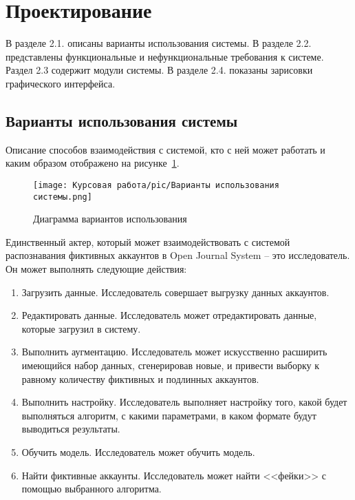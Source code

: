 \newpage
\section{Проектирование}
\label{sec:designing}
В разделе 2.1. описаны варианты использования системы. В разделе 2.2. представлены функциональные и нефункциональные требования к системе. Раздел 2.3 содержит модули системы. В разделе 2.4. показаны зарисовки графического интерфейса.

\vspace{1.5em}
\subsection{Варианты использования системы}
\label{subsec:Variants}
Описание способов взаимодействия с системой, кто с ней может работать и каким образом отображено на рисунке~\ref{ris:variantsUse}.

\begin{figure}[ht]
    \texttt{[image: Курсовая работа/pic/Варианты использования системы.png]}
    \caption{Диаграмма вариантов использования}
    \label{ris:variantsUse}
\end{figure}

Единственный актер, который может взаимодействовать с системой распознавания фиктивных аккаунтов в Open Journal System -- это исследователь. Он может выполнять следующие действия:
\vspace{-1.5em}
\begin{enumerate}[itemsep=0pt, topsep=1.5em]
    \item Загрузить данные. Исследователь совершает выгрузку данных аккаунтов.
    \item Редактировать данные. Исследователь может отредактировать данные, которые загрузил в систему.
    \item Выполнить аугментацию. Исследователь может искусственно расширить имеющийся набор данных, сгенерировав новые, и привести выборку к равному количеству фиктивных и подлинных аккаунтов.
    \item Выполнить настройку. Исследователь выполняет настройку того, какой будет выполняться алгоритм, с какими параметрами, в каком формате будут выводиться результаты.
    \item Обучить модель. Исследователь может обучить модель.
    \item Найти фиктивные аккаунты. Исследователь может найти <<фейки>> с помощью выбранного алгоритма.
\end{enumerate}
\vspace{-1.5em}

